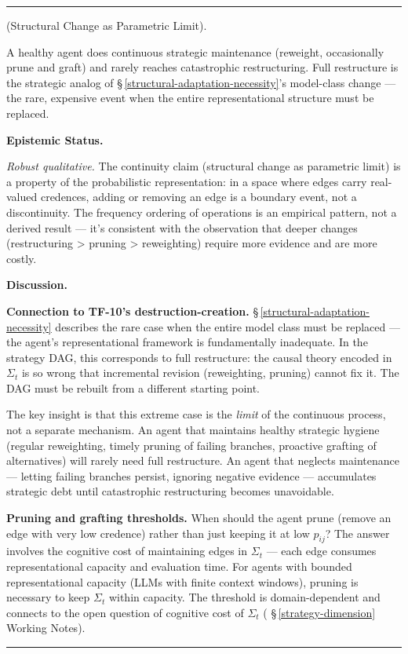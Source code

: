 \documentclass[11pt,oneside]{article}
\newcounter{claim}[section]
\renewcommand{\theclaim}{\thesection.\arabic{claim}}
\newenvironment{segment}[2]{%
  \refstepcounter{claim}%
  \bigskip\noindent\hrule\smallskip
  \noindent{\bfseries #1~\theclaim}\enskip(#2).\par\smallskip
  \noindent\ignorespaces
}{%
  \par\smallskip\noindent\hrule\bigskip
}
\newenvironment{formulation}[1][]{\begin{segment}{Formulation}{#1}}{\end{segment}}
\begin{document}
\begin{formulation}[Structural Change as Parametric Limit]
A healthy agent does continuous strategic maintenance (reweight, occasionally prune and graft) and rarely reaches catastrophic restructuring. Full restructure is the strategic analog of \S\,\ref{structural-adaptation-necessity}'s model-class change — the rare, expensive event when the entire representational structure must be replaced.


\medskip\noindent\textbf{Epistemic Status.}


\textit{Robust qualitative.} The continuity claim (structural change as parametric limit) is a property of the probabilistic representation: in a space where edges carry real-valued credences, adding or removing an edge is a boundary event, not a discontinuity. The frequency ordering of operations is an empirical pattern, not a derived result — it's consistent with the observation that deeper changes (restructuring > pruning > reweighting) require more evidence and are more costly.


\medskip\noindent\textbf{Discussion.}


\textbf{Connection to TF-10's destruction-creation.} \S\,\ref{structural-adaptation-necessity} describes the rare case when the entire model class must be replaced — the agent's representational framework is fundamentally inadequate. In the strategy DAG, this corresponds to full restructure: the causal theory encoded in $\Sigma_t$ is so wrong that incremental revision (reweighting, pruning) cannot fix it. The DAG must be rebuilt from a different starting point.

The key insight is that this extreme case is the \textit{limit} of the continuous process, not a separate mechanism. An agent that maintains healthy strategic hygiene (regular reweighting, timely pruning of failing branches, proactive grafting of alternatives) will rarely need full restructure. An agent that neglects maintenance — letting failing branches persist, ignoring negative evidence — accumulates strategic debt until catastrophic restructuring becomes unavoidable.

\textbf{Pruning and grafting thresholds.} When should the agent prune (remove an edge with very low credence) rather than just keeping it at low $p_{ij}$? The answer involves the cognitive cost of maintaining edges in $\Sigma_t$ — each edge consumes representational capacity and evaluation time. For agents with bounded representational capacity (LLMs with finite context windows), pruning is necessary to keep $\Sigma_t$ within capacity. The threshold is domain-dependent and connects to the open question of cognitive cost of $\Sigma_t$ ( \S\,\ref{strategy-dimension} Working Notes).

\end{formulation}
\end{document}
